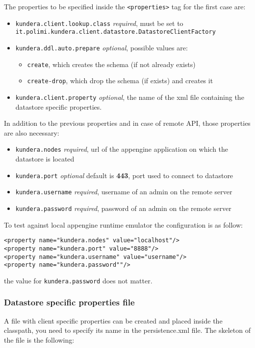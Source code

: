 \newparagraph The properties to be specified inside the \texttt{<properties>} tag for the first case are:
\begin{itemize}
\item \texttt{kundera.client.lookup.class} \textit{required}, must be set to \\ \texttt{it.polimi.kundera.client.datastore.DatastoreClientFactory}
\item \texttt{kundera.ddl.auto.prepare} \textit{optional}, possible values are:
\begin{itemize}
\item \texttt{create}, which creates the schema (if not already exists)
\item \texttt{create-drop}, which drop the schema (if exists) and creates it
\end{itemize}
\item \texttt{kundera.client.property} \textit{optional}, the name of the xml file containing the datastore specific properties.
\end{itemize}

\noindent In addition to the previous properties and in case of remote API, those properties are also necessary:
\begin{itemize}
\item \texttt{kundera.nodes} \textit{required}, url of the appengine application on which the datastore is located
\item \texttt{kundera.port} \textit{optional} default is \textbf{443}, port used to connect to datastore
\item \texttt{kundera.username} \textit{required}, username of an admin on the remote server
\item \texttt{kundera.password} \textit{required}, password of an admin on the remote server
\end{itemize}

\noindent To test against local appengine runtime emulator the configuration is as follow:

\begin{verbatim}
<property name="kundera.nodes" value="localhost"/>
<property name="kundera.port" value="8888"/>
<property name="kundera.username" value="username"/>
<property name="kundera.password""/>
\end{verbatim}

\noindent the value for \texttt{kundera.password} does not matter.

\subsubsection{Datastore specific properties file}
A file with client specific properties can be created and placed inside the classpath, you need to specify its name in the persistence.xml file.
The skeleton of the file is the following:

